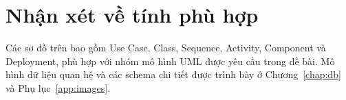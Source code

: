 \clearpage
\section{Nhận xét về tính phù hợp}
Các sơ đồ trên bao gồm Use Case, Class, Sequence, Activity, Component và Deployment, phù hợp với nhóm mô hình UML được yêu cầu trong đề bài. Mô hình dữ liệu quan hệ và các schema chi tiết được trình bày ở Chương~\ref{chap:db} và Phụ lục~\ref{app:images}.
